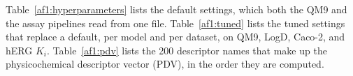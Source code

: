 \label{app:noise:sec:hyperparameters_default}\label{app:noise:sec:hyperparameters_tuned}\label{app:noise:sec:pdv_descriptors}
Table~\ref{af1:hyperparameters} lists the default settings, which both the QM9 and the assay pipelines read from one file. Table~\ref{af1:tuned} lists the tuned settings that replace a default, per model and per dataset, on QM9, LogD, Caco-2, and hERG $K_i$. Table~\ref{af1:pdv} lists the 200 descriptor names that make up the physicochemical descriptor vector (PDV), in the order they are computed.


{\renewcommand{\small}{\scriptsize}\captionsetup{font=footnotesize}}

